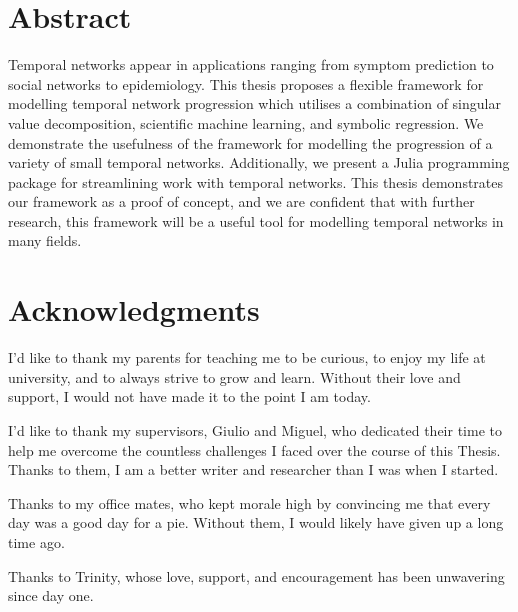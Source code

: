 \documentclass[12pt]{amsbook}
\begin{document}
\restoregeometry
\pagestyle{plain}
{\renewcommand\addcontentsline[3]{}
\section*{Abstract}
}
    Temporal networks appear in applications ranging from symptom prediction to social networks to epidemiology. This thesis proposes a flexible framework for modelling temporal network progression which utilises a combination of singular value decomposition, scientific machine learning, and symbolic regression. We demonstrate the usefulness of the framework for modelling the progression of a variety of small temporal networks. Additionally, we present a Julia programming package for streamlining work with temporal networks. This thesis demonstrates our framework as a proof of concept, and we are confident that with further research, this framework will be a useful tool for modelling temporal networks in many fields.



\newpage
{\renewcommand\addcontentsline[3]{}
\section*{Acknowledgments}
}
    I'd like to thank my parents for teaching me to be curious, to enjoy my life at university, and to always strive to grow and learn. Without their love and support, I would not have made it to the point I am today.

    I'd like to thank my supervisors, Giulio and Miguel, who dedicated their time to help me overcome the countless challenges I faced over the course of this Thesis. Thanks to them, I am a better writer and researcher than I was when I started. 

    Thanks to my office mates, who kept morale high by convincing me that every day was a good day for a pie. Without them, I would likely have given up a long time ago.

    Thanks to Trinity, whose love, support, and encouragement has been unwavering since day one.
    
    
     
{\hypersetup{hidelinks}\tableofcontents}

\pagestyle{headings}
\end{document}
